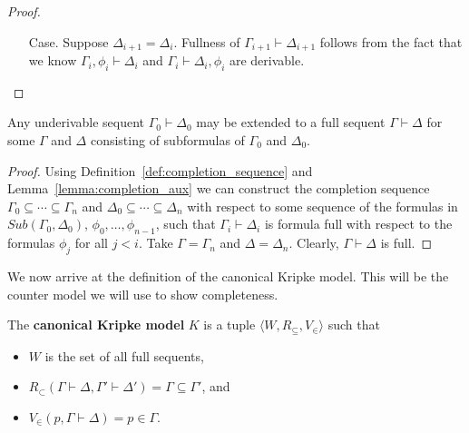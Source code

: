 \documentclass{article}
\begin{document}
\begin{proof}
\begin{itemize}
\begin{itemize}
\begin{itemize}
      \item[Case.] Suppose $\Delta_{i+1} = \Delta_{i}$.  Fullness of $\Gamma_{i+1} \vdash \Delta_{i+1}$
        follows from the fact that we know $\Gamma_i,\phi_i \vdash \Delta_i$ and
        $\Gamma_i \vdash \Delta_i,\phi_i$ are derivable.  
      \end{itemize}

    \end{itemize}

  \end{itemize}

\end{proof}

\begin{lemma}[Completion]
  \label{lemma:completion}
  Any underivable sequent $\Gamma_0 \vdash \Delta_0$ may be extended to a full sequent
  $\Gamma \vdash \Delta$ for some $\Gamma$ and $\Delta$ consisting of subformulas of 
  $\Gamma_0$ and $\Delta_0$.
\end{lemma}
\begin{proof}
  Using Definition~\ref{def:completion_sequence} and Lemma~\ref{lemma:completion_aux} we 
  can construct the completion sequence $\Gamma_0 \subseteq \cdots \subseteq \Gamma_n$ and
  $\Delta_0 \subseteq \cdots \subseteq \Delta_n$ with respect to some sequence of
  the formulas in $Sub(\Gamma_0,\Delta_0)$, $\phi_0,\ldots ,\phi_{n-1}$, such that 
  $\Gamma_i \vdash \Delta_i$ is formula full with respect to the formulas $\phi_j$ for all
  $j < i$.  Take $\Gamma = \Gamma_n$ and $\Delta = \Delta_n$.  
  Clearly, $\Gamma \vdash \Delta$ is full.  
\end{proof}

We now arrive at the definition of the canonical Kripke model. This
will be the counter model we will use to show completeness.

\begin{definition}
  \label{def:canon_model}
  The \textbf{canonical Kripke model} $K$ is a tuple $\langle W, R_\subseteq, V_{\in} \rangle$
  such that 
  \begin{center}
    \begin{itemize}
    \item $W$ is the set of all full sequents,
    \item $R_\subset(\Gamma \vdash \Delta,\Gamma' \vdash \Delta') = \Gamma \subseteq \Gamma'$, and
    \item $V_\in(p, \Gamma \vdash \Delta) = p \in \Gamma$.
    \end{itemize}
  \end{center}
\end{definition}
\end{document}
